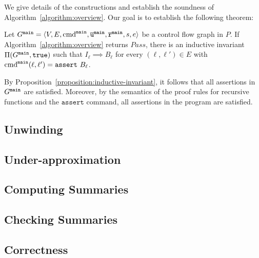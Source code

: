 
We give details of the constructions and establish the soundness of
Algorithm~\ref{algorithm:overview}. Our goal is to establish the
following theorem:

\begin{theorem}
  Let $G^{\mathtt{{main}}} = \langle V, E, \textmd{cmd}^{\mathtt{{main}}} , \overline{\mathtt{u}}^{\mathtt{{main}}}, \overline{\mathtt{r}}^{\mathtt{{main}}},s,e \rangle$ be a control flow
  graph in $P$. If Algorithm~\ref{algorithm:overview} returns
  $\mathit{Pass}$, there is an inductive invariant $\Pi (G^{\mathtt{{main}}}, \mathtt{true})$
  such that $I_{\ell} \implies B_{\ell}$ for every $(\ell, \ell') \in
  E$ with $\textmd{cmd}^{\mathtt{{main}}} (\ell, \ell') = \mathtt{assert\ } B_{\ell}$.
  \label{theorem:soundness}
\end{theorem}
By Proposition~\ref{proposition:inductive-invariant}, it follows that
all assertions in $G^{\mathtt{{main}}}$ are satisfied.
Moreover, by the semantics of the proof rules for recursive functions and the 
$\mathtt{assert}$ command, all assertions in the program are satisfied.



 
\subsection{Unwinding}
\label{subsection:unwinding}


\subsection{Under-approximation}
\label{subsection:under-approximation}


\subsection{Computing Summaries}
\label{subsection:updating-summary}


\subsection{Checking Summaries}
\label{subsection:checking-summary}


\subsection{Correctness}
\label{subsection:correctness}

